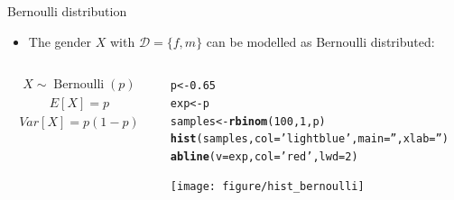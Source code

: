 \documentclass{beamer}\usepackage[]{graphicx}\usepackage[]{color}
\makeatletter
\newcommand{\hlnum}[1]{\textcolor[rgb]{0.686,0.059,0.569}{#1}}%
\newcommand{\hlstr}[1]{\textcolor[rgb]{0.192,0.494,0.8}{#1}}%
\newcommand{\hlstd}[1]{\textcolor[rgb]{0.345,0.345,0.345}{#1}}%
\newcommand{\hlkwb}[1]{\textcolor[rgb]{0.69,0.353,0.396}{#1}}%
\newcommand{\hlkwc}[1]{\textcolor[rgb]{0.333,0.667,0.333}{#1}}%
\newcommand{\hlkwd}[1]{\textcolor[rgb]{0.737,0.353,0.396}{\textbf{#1}}}%
\newenvironment{kframe}{%
 \def\at@end@of@kframe{}%
 \ifinner\ifhmode%
  \def\at@end@of@kframe{\end{minipage}}%
  \begin{minipage}{\columnwidth}%
 \fi\fi%
 \def\FrameCommand##1{\hskip\@totalleftmargin \hskip-\fboxsep
 \colorbox{shadecolor}{##1}\hskip-\fboxsep
     \hskip-\linewidth \hskip-\@totalleftmargin \hskip\columnwidth}%
 \MakeFramed {\advance\hsize-\width
   \@totalleftmargin\z@ \linewidth\hsize
   \@setminipage}}%
 {\par\unskip\endMakeFramed%
 \at@end@of@kframe}
\newenvironment{knitrout}{}{} %
\makeatother
\begin{document}
\begin{frame}[fragile]{Bernoulli distribution}
  \begin{itemize}
    \item The gender $X$ with $\mathcal{D}=\{f, m\}$ can be modelled as
      Bernoulli distributed:
  \end{itemize}
  \begin{columns}
    \begin{column}{.5\linewidth}
      \begin{align*}
        X \sim \operatorname{Bernoulli}(p)
      \end{align*}
      \begin{align*}
        E[X] = p
      \end{align*}
      \begin{align*}
        Var[X] = p(1-p)
      \end{align*}
    \end{column}
    \begin{column}{0.5\linewidth}
\begin{knitrout}\tiny
{}\color{fgcolor}\begin{kframe}
\begin{alltt}
\hlstd{p} \hlkwb{<-} \hlnum{0.65}
\hlstd{exp} \hlkwb{<-} \hlstd{p}
\hlstd{samples} \hlkwb{<-} \hlkwd{rbinom}\hlstd{(}\hlnum{100}\hlstd{,} \hlnum{1}\hlstd{, p)}
\hlkwd{hist}\hlstd{(samples,} \hlkwc{col}\hlstd{=}\hlstr{'lightblue'}\hlstd{,} \hlkwc{main}\hlstd{=}\hlstr{''}\hlstd{,} \hlkwc{xlab}\hlstd{=}\hlstr{''}\hlstd{)}
\hlkwd{abline}\hlstd{(}\hlkwc{v}\hlstd{=exp,} \hlkwc{col}\hlstd{=}\hlstr{'red'}\hlstd{,} \hlkwc{lwd}\hlstd{=}\hlnum{2}\hlstd{)}
\end{alltt}
\end{kframe}

{\centering \texttt{[image: figure/hist\_bernoulli]} 

}



\end{knitrout}
    \end{column}
  \end{columns}
\end{frame}
\end{document}
